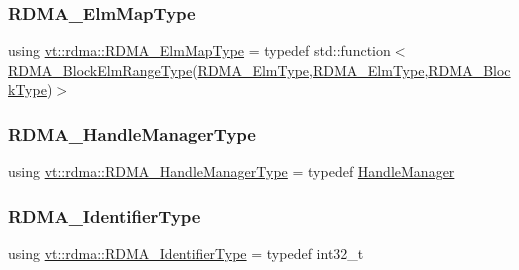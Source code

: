 \mbox{\label{namespacevt_1_1rdma_a6798ab36a5dcb8749c25dff719f9ce07}} 
\subsubsection{\texorpdfstring{R\+D\+M\+A\+\_\+\+Elm\+Map\+Type}{RDMA\_ElmMapType}}
{\footnotesize\ttfamily using \hyperlink{namespacevt_1_1rdma_a6798ab36a5dcb8749c25dff719f9ce07}{vt\+::rdma\+::\+R\+D\+M\+A\+\_\+\+Elm\+Map\+Type} = typedef std\+::function$<$\hyperlink{namespacevt_1_1rdma_a8320f97b4a2866df60d9778486dbcd0f}{R\+D\+M\+A\+\_\+\+Block\+Elm\+Range\+Type}(\hyperlink{namespacevt_a2c2a902092b72056f70210c159f966f0}{R\+D\+M\+A\+\_\+\+Elm\+Type},\hyperlink{namespacevt_a2c2a902092b72056f70210c159f966f0}{R\+D\+M\+A\+\_\+\+Elm\+Type},\hyperlink{namespacevt_ae54d2ca8f6bb4d65faf65118c82cd6f7}{R\+D\+M\+A\+\_\+\+Block\+Type})$>$}

\mbox{\label{namespacevt_1_1rdma_a09c31fc860965bddd7a22f6adceb96fd}} 
\subsubsection{\texorpdfstring{R\+D\+M\+A\+\_\+\+Handle\+Manager\+Type}{RDMA\_HandleManagerType}}
{\footnotesize\ttfamily using \hyperlink{namespacevt_1_1rdma_a09c31fc860965bddd7a22f6adceb96fd}{vt\+::rdma\+::\+R\+D\+M\+A\+\_\+\+Handle\+Manager\+Type} = typedef \hyperlink{structvt_1_1rdma_1_1_handle_manager}{Handle\+Manager}}

\mbox{\label{namespacevt_1_1rdma_a3b7f2eba1e9063a37d9301061c1432f1}} 
\subsubsection{\texorpdfstring{R\+D\+M\+A\+\_\+\+Identifier\+Type}{RDMA\_IdentifierType}}
{\footnotesize\ttfamily using \hyperlink{namespacevt_1_1rdma_a3b7f2eba1e9063a37d9301061c1432f1}{vt\+::rdma\+::\+R\+D\+M\+A\+\_\+\+Identifier\+Type} = typedef int32\+\_\+t}

